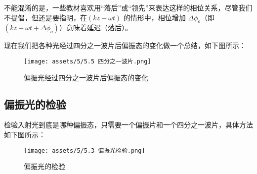 \documentclass[UTF8]{report}
\theoremstyle{MyLineTheoremStyle} %
\theoremstyle{MyBlockTheoremStyle} %
\theoremstyle{MySubsubsectionStyle} %
\begin{document}
不能混淆的是，一些教材喜欢用“落后”或“领先”来表达这样的相位关系，尽管我们不提倡，但还是要指明，在$(kz - \omega t)$ 的情形中，相位增加 $\Delta \phi_o$（即 $(kz - \omega t + \Delta \phi_o)$）意味着延迟（落后）。

现在我们把各种光经过四分之一波片后偏振态的变化做一个总结，如下图所示：
\begin{figure}[H]\centering
    \texttt{[image: assets/5/5.5 四分之一波片.png]}
    \caption{偏振光经过四分之一波片后偏振态的变化}
\end{figure}

\subsection{偏振光的检验}
检验入射光到底是哪种偏振态，只需要一个偏振片和一个四分之一波片，具体方法如下图所示：
\begin{figure}[H]\centering
    \texttt{[image: assets/5/5.3 偏振光检验.png]}
    \caption{偏振光的检验}
\end{figure}




\end{document}
